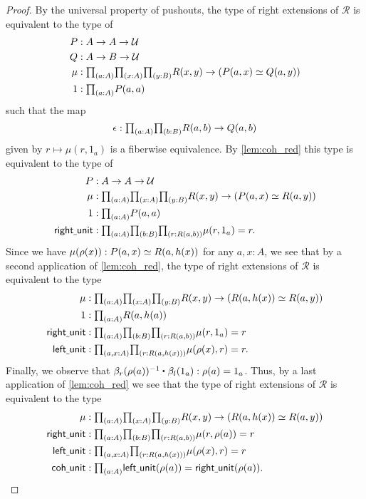 \begin{proof}
By the universal property of pushouts, the type of right extensions of $\mathcal{R}$ is equivalent to the type of
\begin{align*}
P & : A\to A \to \UU \\
Q & : A \to B \to \UU \\
\mu & : \prd{a:A}{x:A}{y:B} R(x,y)\to (P(a,x)\eqvsym Q(a,y)) \\
1 & : \prd{a:A} P(a,a)
\end{align*}
such that the map
\begin{equation*}
\epsilon : \prd{a:A}{b:B} R(a,b)\to Q(a,b)
\end{equation*}
given by $r\mapsto \mu(r,1_a)$ is a fiberwise equivalence. By \autoref{lem:coh_red} this type is equivalent to the type of
\begin{align*}
P & : A\to A \to \UU \\
\mu & : \prd{a:A}{x:A}{y:B} R(x,y)\to (P(a,x)\eqvsym R(a,y)) \\
1 & : \prd{a:A} P(a,a) \\
\mathsf{right\usc{}unit} & : \prd{a:A}{b:B}{r:R(a,b)} \mu(r,1_a)=r.
\end{align*}
Since we have $\mu(\rho(x)) : P(a,x) \simeq R(a,h(x))$ for any $a,x:A$, we see that by a second application of \autoref{lem:coh_red}, the type of right extensions of $\mathcal{R}$ is equivalent to the type
\begin{align*}
\mu & : \prd{a:A}{x:A}{y:B} R(x,y)\to (R(a,h(x))\eqvsym R(a,y)) \\
1 & : \prd{a:A} R(a,h(a)) \\
\mathsf{right\usc{}unit} & : \prd{a:A}{b:B}{r:R(a,b)} \mu(r,1_a)=r \\
\mathsf{left\usc{}unit} & : \prd{a,x:A}{r:R(a,h(x))} \mu(\rho(x),r)=r.
\end{align*}
Finally, we observe that $\ct{\beta_r(\rho(a))^{-1}}{\beta_l(1_a)}:\rho(a)=1_a$. Thus, by a last application of \autoref{lem:coh_red} we see that the type of right extensions of $\mathcal{R}$ is equivalent to the type
\begin{align*}
\mu & : \prd{a:A}{x:A}{y:B} R(x,y)\to (R(a,h(x))\eqvsym R(a,y)) \\
\mathsf{right\usc{}unit} & : \prd{a:A}{b:B}{r:R(a,b)} \mu(r,\rho(a))=r \\
\mathsf{left\usc{}unit} & : \prd{a,x:A}{r:R(a,h(x))} \mu(\rho(x),r)=r \\
\mathsf{coh\usc{}unit} & : \prd{a:A} \mathsf{left\usc{}unit}(\rho(a))=\mathsf{right\usc{}unit}(\rho(a)).\qedhere
\end{align*}
\end{proof}

